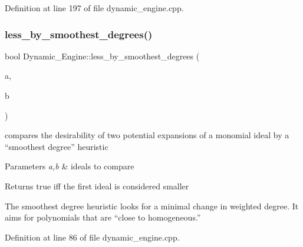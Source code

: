 Definition at line 197 of file dynamic\+\_\+engine.\+cpp.

\mbox{\label{namespace_dynamic___engine_aa27b3fbb646d1d0f5d35de5a69e1cb29}} 
\subsubsection{\texorpdfstring{less\+\_\+by\+\_\+smoothest\+\_\+degrees()}{less\_by\_smoothest\_degrees()}}
{\footnotesize\ttfamily bool Dynamic\+\_\+\+Engine\+::less\+\_\+by\+\_\+smoothest\+\_\+degrees (\begin{DoxyParamCaption}\item[{\hyperlink{group___g_b_computation_class_dynamic___engine_1_1_p_p___with___ideal}{P\+P\+\_\+\+With\+\_\+\+Ideal} \&}]{a,  }\item[{\hyperlink{group___g_b_computation_class_dynamic___engine_1_1_p_p___with___ideal}{P\+P\+\_\+\+With\+\_\+\+Ideal} \&}]{b }\end{DoxyParamCaption})}



compares the desirability of two potential expansions of a monomial ideal by a ``smoothest degree'' heuristic 


\begin{DoxyParams}{Parameters}
{\em a,b} & ideals to compare \\
\hline
\end{DoxyParams}
\begin{DoxyReturn}{Returns}
{\ttfamily true} iff the first ideal is considered smaller
\end{DoxyReturn}
The smoothest degree heuristic looks for a minimal change in weighted degree. It aims for polynomials that are ``close to homogeneous.'' 

Definition at line 86 of file dynamic\+\_\+engine.\+cpp.

\mbox{\label{namespace_dynamic___engine_a06310dff730cbb5b133b3c907ceb6053}} 
